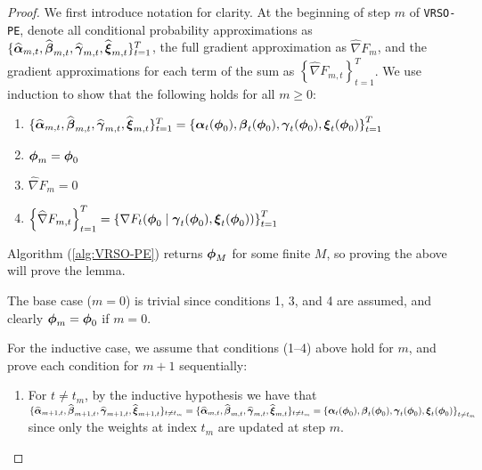 \begin{proof}

    We first introduce notation for clarity. At the beginning of step $m$ of \texttt{VRSO-PE}, denote all conditional probability approximations as $\{\widehat {\boldsymbol{\alpha}}_{m,t}, \widehat {\boldsymbol{\beta}}_{m,t}, \widehat {\boldsymbol{\gamma}}_{m,t}, \widehat {\boldsymbol{\xi}}_{m,t}\}_{t=1}^T$, the full gradient approximation as $\widehat \nabla F_m$, and the gradient approximations for each term of the sum as $\left\{\widehat \nabla F_{m,t} \right\}_{t=1}^T$. We use induction to show that the following holds for all $m \geq 0$:

    \begin{enumerate}
        \item $\{\widehat {\boldsymbol{\alpha}}_{m,t}, \widehat {\boldsymbol{\beta}}_{m,t}, \widehat {\boldsymbol{\gamma}}_{m,t}, \widehat {\boldsymbol{\xi}}_{m,t}\}_{t=1}^T = \left\{\boldsymbol{\alpha}_t(\boldsymbol{\phi}_0),\boldsymbol{\beta}_t(\boldsymbol{\phi}_0),\boldsymbol{\gamma}_t(\boldsymbol{\phi}_0),\boldsymbol{\xi}_t(\boldsymbol{\phi}_0)\right\}_{t=1}^T$
        \item $\boldsymbol{\phi}_m = \boldsymbol{\phi}_0$
        \item $\widehat \nabla F_m = 0$
        \item $\left\{\widehat \nabla F_{m,t} \right\}_{t=1}^T = \left\{\nabla F_t(\boldsymbol{\phi}_0 \mid \boldsymbol{\gamma}_t(\boldsymbol{\phi}_0),\boldsymbol{\xi}_t(\boldsymbol{\phi}_0))\right\}_{t=1}^T$
    \end{enumerate}

    Algorithm (\ref{alg:VRSO-PE}) returns $\boldsymbol{\phi}_M$ for some finite $M$, so proving the above will prove the lemma.

    The base case ($m=0$) is trivial since conditions 1, 3, and 4 are assumed, and clearly $\boldsymbol{\phi}_m = \boldsymbol{\phi}_0$ if $m=0$.

    For the inductive case, we assume that conditions (1--4) above hold for $m$, and prove each condition for $m+1$ sequentially:

    \begin{enumerate}
        \item For $t \neq t_m$, by the inductive hypothesis we have that $\{\widehat {\boldsymbol{\alpha}}_{m+1,t}, \widehat {\boldsymbol{\beta}}_{m+1,t}, \widehat {\boldsymbol{\gamma}}_{m+1,t}, \widehat {\boldsymbol{\xi}}_{m+1,t}\}_{t \neq t_m} = \{\widehat {\boldsymbol{\alpha}}_{m,t}, \widehat {\boldsymbol{\beta}}_{m,t}, \widehat {\boldsymbol{\gamma}}_{m,t}, \widehat {\boldsymbol{\xi}}_{m,t}\}_{t \neq t_m} = \left\{\boldsymbol{\alpha}_t(\boldsymbol{\phi}_0),\boldsymbol{\beta}_t(\boldsymbol{\phi}_0),\boldsymbol{\gamma}_t(\boldsymbol{\phi}_0),\boldsymbol{\xi}_t(\boldsymbol{\phi}_0)\right\}_{t \neq t_m}$ since only the weights at index $t_m$ are updated at step $m$.
        

\end{enumerate}
\end{proof}
